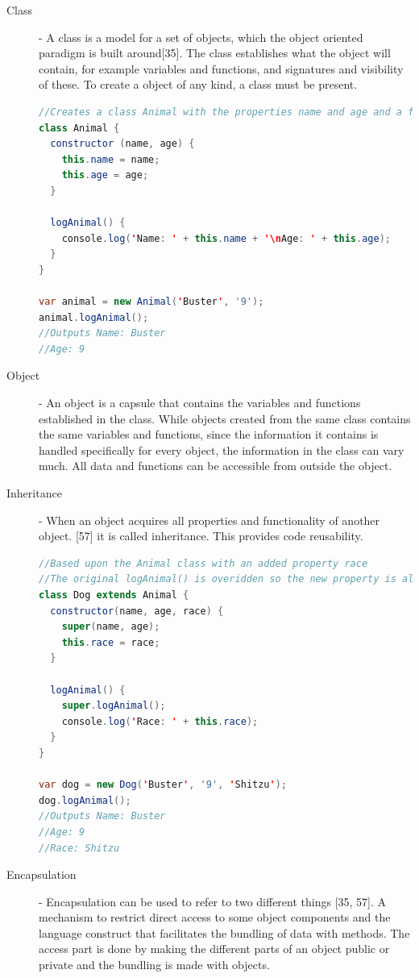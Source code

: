\documentclass {article}
\begin{document}
\begin{description}
\item [Class] - A class is a model for a set of objects, which the object oriented paradigm is built around[35]. The class establishes what the object will contain, for example variables and functions, and signatures and visibility of these. To create a object of any kind, a class must be present. 

\begin{lstlisting}[language=Java]
//Creates a class Animal with the properties name and age and a function for logging the properties to the screen
class Animal {
  constructor (name, age) {
    this.name = name;
    this.age = age;
  }

  logAnimal() {
    console.log('Name: ' + this.name + '\nAge: ' + this.age);
  }
}

var animal = new Animal('Buster', '9');
animal.logAnimal();
//Outputs Name: Buster
//Age: 9
\end{lstlisting}

\item [Object] - An object is a capsule that contains the variables and functions established in the class. While objects created from the same class contains the same variables and functions, since the information it contains is handled specifically for every object, the information in the class can vary much. All data and functions can be accessible from outside the object. 

\item [Inheritance] - When an object acquires all properties and functionality of another object. [57] it is called inheritance. This provides code reusability. 

\begin{lstlisting}[language=Java, breaklines=true]
//Based upon the Animal class with an added property race
//The original logAnimal() is overidden so the new property is also logged to the screen.
class Dog extends Animal {
  constructor(name, age, race) {
    super(name, age);
    this.race = race;
  }

  logAnimal() {
    super.logAnimal();
    console.log('Race: ' + this.race);
  }
}

var dog = new Dog('Buster', '9', 'Shitzu');
dog.logAnimal();
//Outputs Name: Buster
//Age: 9
//Race: Shitzu
\end{lstlisting}

\item [Encapsulation] - Encapsulation can be used to refer to two different things [35, 57]. A mechanism to restrict direct access to some object components and the language construct that facilitates the bundling of data with methods. The access part is done by making the different parts of an object public or private and the bundling is made with objects.


\end{description}
\end{document}
